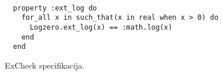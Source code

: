 \begin{figure}
\begin{verbatim}

  property :ext_log do
    for_all x in such_that(x in real when x > 0) do
      Logzero.ext_log(x) == :math.log(x)
    end
  end
\end{verbatim}
\caption{ExCheck specifikacija.}
\label{fig:impl:excheck_extended_logarithm}
\end{figure}
